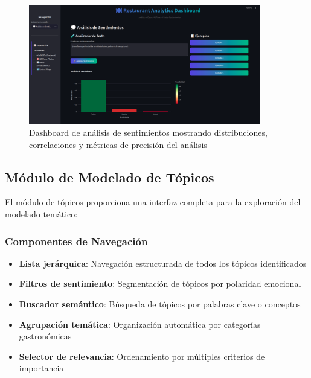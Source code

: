 \documentclass[12pt,a4paper,twoside,openany]{book}
\begin{document}
\begin{figure}[H]
\centering
\includegraphics[width=0.9\textwidth]{figures/streamlit_sentimental_analysis.png}
\caption{Dashboard de análisis de sentimientos mostrando distribuciones, correlaciones y métricas de precisión del análisis}
\label{fig:streamlit_sentiment_analysis}
\end{figure}

\subsection{Módulo de Modelado de Tópicos}

El módulo de tópicos proporciona una interfaz completa para la exploración del modelado temático:

\subsubsection{Componentes de Navegación}
\begin{itemize}
    \item \textbf{Lista jerárquica}: Navegación estructurada de todos los tópicos identificados
    \item \textbf{Filtros de sentimiento}: Segmentación de tópicos por polaridad emocional
    \item \textbf{Buscador semántico}: Búsqueda de tópicos por palabras clave o conceptos
    \item \textbf{Agrupación temática}: Organización automática por categorías gastronómicas
    \item \textbf{Selector de relevancia}: Ordenamiento por múltiples criterios de importancia
\end{itemize}
\end{document}
